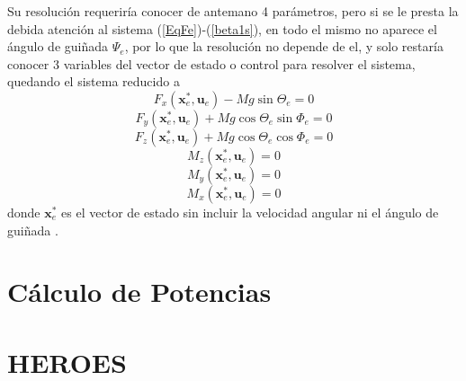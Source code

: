 Su resolución requeriría conocer de antemano 4 parámetros, pero si se le presta la debida atención al sistema (\ref{EqFe})-(\ref{beta1s}), en todo el mismo no aparece el ángulo de guiñada $\Psi_e$, por lo que la resolución no depende de el, y solo restaría conocer 3 variables del vector de estado o control para resolver el sistema, quedando el sistema reducido a
\begin{equation}
	F_x(\mathrm{\textbf{x}}_e^*,\mathrm{\textbf{u}}_e)-Mg\sin\Theta_e=0
\end{equation}
\begin{equation}
	F_y(\mathrm{\textbf{x}}_e^*,\mathrm{\textbf{u}}_e)+Mg\cos\Theta_e\sin\Phi_e=0
\end{equation}
\begin{equation}
	F_z(\mathrm{\textbf{x}}_e^*,\mathrm{\textbf{u}}_e)+Mg\cos\Theta_e\cos\Phi_e=0
\end{equation}
\begin{equation}
	M_z(\mathrm{\textbf{x}}_e^*,\mathrm{\textbf{u}}_e)=0
\end{equation}
\begin{equation}
	M_y(\mathrm{\textbf{x}}_e^*,\mathrm{\textbf{u}}_e)=0
\end{equation}
\begin{equation}
	M_x(\mathrm{\textbf{x}}_e^*,\mathrm{\textbf{u}}_e)=0
\end{equation}
donde $\mathrm{\textbf{x}}_e^*$ es el vector de estado sin incluir la velocidad angular ni el ángulo de guiñada \citep{Cuerva}.

\section{Cálculo de Potencias}


\section[\textbf{HE}licopter and \textbf{RO}tor \textbf{E}quilibrium and \textbf{S}tability toolbox]{HEROES}

